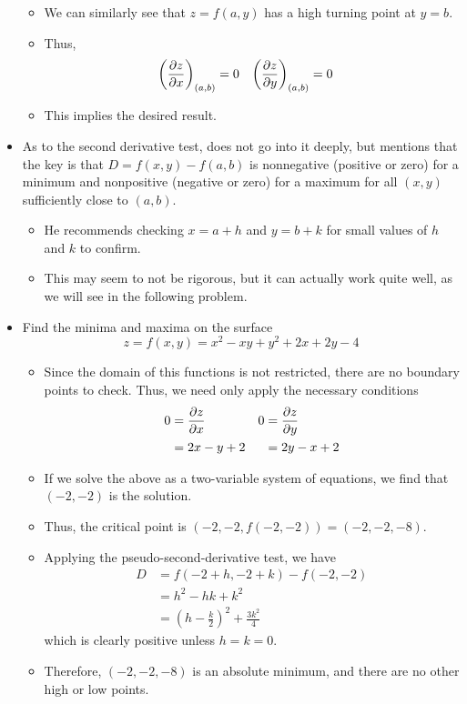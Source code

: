 \documentclass[../main.tex]{subfiles}
\begin{document}
\begin{itemize}
\begin{itemize}
        \item We can similarly see that $z=f(a,y)$ has a high turning point at $y=b$.
        \item Thus,
        \begin{align*}
            \left( \pdv{z}{x} \right)_{(a,b)} &= 0&
                \left( \pdv{z}{y} \right)_{(a,b)} &= 0
        \end{align*}
        \item This implies the desired result.
    \end{itemize}
    \item As to the second derivative test, \cite{bib:Thomas} does not go into it deeply, but mentions that the key is that $D=f(x,y)-f(a,b)$ is nonnegative (positive or zero) for a minimum and nonpositive (negative or zero) for a maximum for all $(x,y)$ sufficiently close to $(a,b)$.
    \begin{itemize}
        \item He recommends checking $x=a+h$ and $y=b+k$ for small values of $h$ and $k$ to confirm.
        \item This may seem to not be rigorous, but it can actually work quite well, as we will see in the following problem.
    \end{itemize}
    \item Find the minima and maxima on the surface
    \begin{equation*}
        z = f(x,y) = x^2-xy+y^2+2x+2y-4
    \end{equation*}
    \begin{itemize}
        \item Since the domain of this functions is not restricted, there are no boundary points to check. Thus, we need only apply the necessary conditions
        \begin{align*}
            0 &= \pdv{z}{x}&
                0 &= \pdv{z}{y}\\
            &= 2x-y+2&
                &= 2y-x+2
        \end{align*}
        \item If we solve the above as a two-variable system of equations, we find that $(-2,-2)$ is the solution.
        \item Thus, the critical point is $(-2,-2,f(-2,-2))=(-2,-2,-8)$.
        \item Applying the pseudo-second-derivative test, we have
        \begin{align*}
            D &= f(-2+h,-2+k)-f(-2,-2)\\
            &= h^2-hk+k^2\\
            &= \left( h-\frac{k}{2} \right)^2+\frac{3k^2}{4}
        \end{align*}
        which is clearly positive unless $h=k=0$.
        \item Therefore, $(-2,-2,-8)$ is an absolute minimum, and there are no other high or low points.
    \end{itemize}
\end{itemize}
\end{document}
